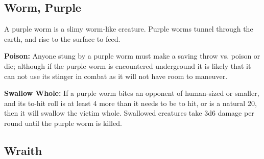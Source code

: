 \begin{multicols*}{2}
\subsection{Worm, Purple}

A purple worm is a slimy worm-like creature. Purple worms tunnel through the earth, and rise to the surface to feed.

\textbf{Poison:} Anyone stung by a purple worm must make a saving throw vs. poison or die; although if the purple worm is encountered underground it is likely that it can not use its stinger in combat as it will not have room to maneuver.

\textbf{Swallow Whole:} If a purple worm bites an opponent of human-sized or smaller, and its to-hit roll is at least 4 more than it needs to be to hit, or is a natural 20, then it will swallow the victim whole. Swallowed creatures take 3d6 damage per round until the purple worm is killed.

\subsection{Wraith}
\end{multicols*}
